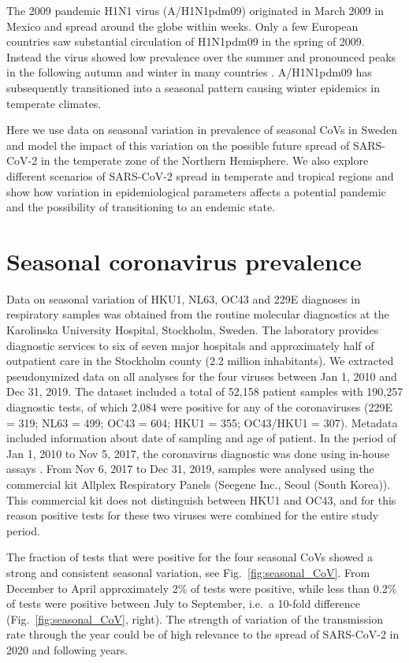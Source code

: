 \documentclass[rmp, reprint, superscriptaddress, floatfix,amsmath]{revtex4-1}
\begin{document}
The 2009 pandemic H1N1 virus (A/H1N1pdm09) originated in March 2009 in Mexico and spread around the globe within weeks.
Only a few European countries saw substantial circulation of H1N1pdm09 in the spring of 2009. Instead the virus showed low prevalence over the summer and pronounced peaks in the following autumn and winter in many countries \citep{amato-gauci_surveillance_2011}.
A/H1N1pdm09 has subsequently transitioned into a seasonal pattern causing winter epidemics in temperate climates.

Here we use data on seasonal variation in prevalence of seasonal CoVs in Sweden and model the impact of this variation on the possible future spread of SARS-CoV-2 in the temperate zone of the Northern Hemisphere. 
We also explore different scenarios of SARS-CoV-2 spread in temperate and tropical regions and show how variation in epidemiological parameters affects a potential pandemic and the possibility of transitioning to an endemic state. 

\section{Seasonal coronavirus prevalence} 

Data on seasonal variation of HKU1, NL63, OC43 and 229E diagnoses in respiratory samples was obtained from the routine molecular diagnostics at the Karolinska University Hospital, Stockholm, Sweden. The laboratory provides diagnostic services to six of seven major hospitals and approximately half of outpatient care in the Stockholm county (2.2 million inhabitants). We extracted pseudonymized data on all analyses for the four viruses between Jan 1, 2010 and Dec 31, 2019. The dataset included a total of 52,158 patient samples with 190,257 diagnostic tests, of which 2,084 were positive for any of the coronaviruses (229E = 319; NL63 = 499; OC43 = 604; HKU1 = 355; OC43/HKU1 = 307). Metadata included information about date of sampling and age of patient. 
In the period of Jan 1, 2010 to Nov 5, 2017, the coronavirus diagnostic was done using in-house assays \citep{tiveljung2009development}. From Nov 6, 2017 to Dec 31, 2019, samples were analysed using the commercial kit Allplex Respiratory Panels (Seegene Inc., Seoul (South Korea)). This commercial kit does not distinguish between HKU1 and OC43, and for this reason positive tests for these two viruses were combined for the entire study period. 

The fraction of tests that were positive for the four seasonal CoVs showed a strong and consistent seasonal variation, see Fig.~\ref{fig:seasonal_CoV}. 
From December to April approximately 2\%  of tests were positive, while less than 0.2\% of tests were positive between July to September, i.e.~a 10-fold difference (Fig.~\ref{fig:seasonal_CoV}, right).
The strength of variation of the transmission rate through the year could be of high relevance to the spread of SARS-CoV-2 in 2020 and following years. 
\end{document}

